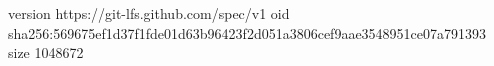 version https://git-lfs.github.com/spec/v1
oid sha256:569675ef1d37f1fde01d63b96423f2d051a3806cef9aae3548951ce07a791393
size 1048672
